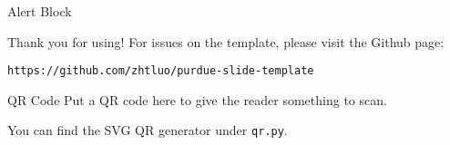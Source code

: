 \documentclass{purdue-poster}
\begin{document}
\begin{frame}{}
\begin{columns}[c]
\begin{column}{.48\linewidth}
\begin{alertblock}{Alert Block}
    \bigskip
    
    \lipsum[7]
    \end{alertblock}

    \begin{block}{Thank you for using!}
        For issues on the template, please visit the Github page:
        
        {\small\texttt{https://github.com/zhtluo/purdue-slide-template}\par}
    \end{block}

    \begin{block}{\large QR Code}
        Put a QR code here to give the reader something to scan.

        You can find the SVG QR generator under \texttt{qr.py}.

        \begin{figure}
            {\centering}
        \end{figure}
    \end{block}
    \end{column}
    \end{columns}
    \vfill
\end{frame}
\end{document}
